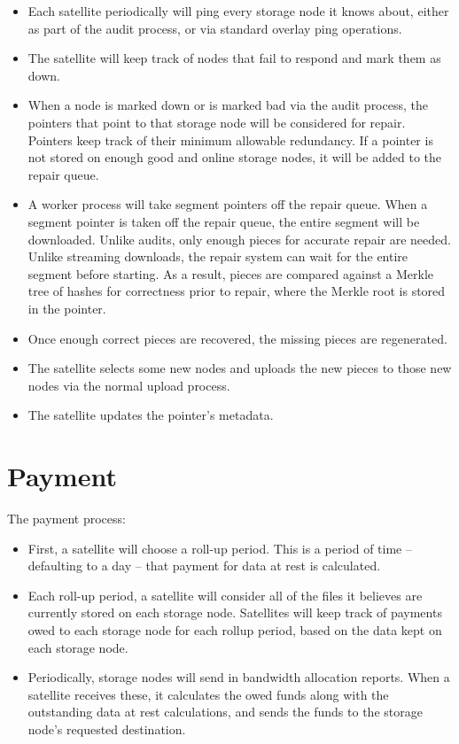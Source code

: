 \documentclass[11pt,fleqn,openany]{book}
\begin{document}
\begin{itemize}
\item Each satellite periodically will ping every storage node it knows
about,
  either as part of the audit process, or via standard overlay ping operations.
\item The satellite will keep track of nodes that fail to respond and mark
  them as down.
\item When a node is marked down or is marked bad via the audit process, the
  pointers that point to that storage node will be considered for repair.
  Pointers
  keep track of their minimum allowable redundancy. If a pointer is not stored
  on enough good and online storage nodes, it will be added to the repair queue.
\item A worker process will take segment pointers off the repair queue. When
  a segment pointer is taken off the repair queue, the entire segment will be
  downloaded. Unlike audits, only enough pieces for accurate repair are needed.
  Unlike streaming downloads, the repair system can wait for the entire segment
  before starting. As a result, pieces are compared against a Merkle tree of
  hashes for correctness prior to repair, where the Merkle root is stored in
  the pointer.
\item Once enough correct pieces are recovered, the missing pieces are
  regenerated.
\item The satellite selects some new nodes and uploads the new pieces to
  those new nodes via the normal upload process.
\item The satellite updates the pointer's metadata.
\end{itemize}

\section{Payment}

The payment process:

\begin{itemize}
\item First, a satellite will choose a roll-up period. This is a period of
  time -- defaulting to a day -- that payment for data at rest is calculated.
\item Each roll-up period, a satellite will consider all of the files it
  believes are currently stored on each storage node. Satellites will keep track
of payments owed to each storage node for each rollup period, based on
the data kept on each storage node.
\item Periodically, storage nodes will send in bandwidth allocation reports.
When a
  satellite receives these, it calculates the owed funds along with the
  outstanding data at rest calculations, and sends the funds to the storage
  node's requested destination.
\end{itemize}
\end{document}
